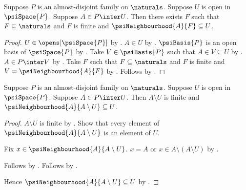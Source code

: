 \begin{corollary}\label{psi_family_point_open_refinement}
    Suppose $P$ is an almost-disjoint family on $\naturals$.
    Suppose $U$ is open in $\psiSpace{P}$.
    Suppose $A\in P\inter U$.
    Then there exists $F$ such that
        $F\subseteq\naturals$ and $F$ is finite and
        $\psiNeighbourhood{A}{F}\subseteq U$.
\end{corollary}
\begin{proof}
    $U\in\opens[\psiSpace{P}]$ by .
    $A\in U$ by .
    $\psiBasis{P}$ is an open basis of $\psiSpace{P}$
        by .
    Take $V\in\psiBasis{P}$ such that $A\in V\subseteq U$
        by .
    $A\in P\inter V$ by .
    Take $F$ such that $F\subseteq\naturals$ and $F$ is finite and
        $V=\psiNeighbourhood{A}{F}$
        by .
    Follows by \auto.
\end{proof}

\begin{corollary}\label{psi_family_point_canonical_open_refinement}
    Suppose $P$ is an almost-disjoint family on $\naturals$.
    Suppose $U$ is open in $\psiSpace{P}$.
    Suppose $A\in P\inter U$.
    Then $A\setminus U$ is finite and
        $\psiNeighbourhood{A}{A\setminus U}\subseteq U$.
\end{corollary}
\begin{proof}
    $A\setminus U$ is finite by .
    Show that every element of $\psiNeighbourhood{A}{A\setminus U}$
        is an element of $U$.
    \begin{subproof}
        Fix $x\in\psiNeighbourhood{A}{A\setminus U}$.
        $x=A$ or $x\in A\setminus(A\setminus U)$
            by .
        \begin{byCase}
                Follows by .
                Follows by .
        \end{byCase}
    \end{subproof}
    Hence $\psiNeighbourhood{A}{A\setminus U}\subseteq U$
        by .
\end{proof}


